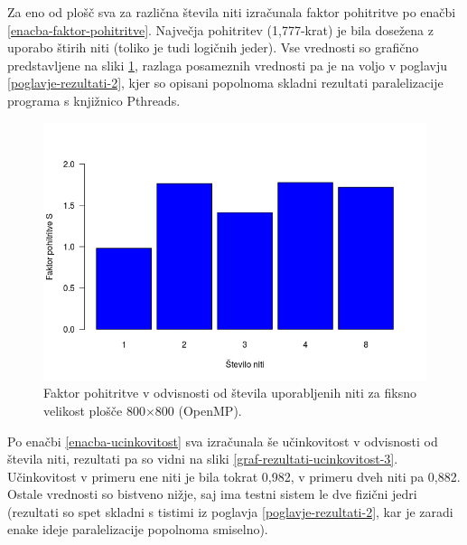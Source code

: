 \documentclass[a4paper,titlepage,11pt]{article}
\begin{document}
Za eno od plošč sva za različna števila niti izračunala faktor pohitritve po enačbi \ref{enacba-faktor-pohitritve}. Največja pohitritev (1,777-krat) je bila dosežena z uporabo štirih niti (toliko je tudi logičnih jeder). Vse vrednosti so grafično predstavljene na sliki \ref{graf-rezultati-pohitritev-3}, razlaga posameznih vrednosti pa je na voljo v poglavju \ref{poglavje-rezultati-2}, kjer so opisani popolnoma skladni rezultati paralelizacije programa s knjižnico Pthreads.

\begin{figure}[H]
\begin{center}
\includegraphics[scale=0.55]{graf-rezultati-3_2.png}
\caption{Faktor pohitritve v odvisnosti od števila uporabljenih niti za fiksno velikost plošče 800$\times$800 (OpenMP).}
\label{graf-rezultati-pohitritev-3}
\end{center}
\vspace{-25pt}
\end{figure}

Po enačbi \ref{enacba-ucinkovitost} sva izračunala še učinkovitost v odvisnosti od števila niti, rezultati pa so vidni na sliki \ref{graf-rezultati-ucinkovitost-3}. Učinkovitost v primeru ene niti je bila tokrat 0,982, v primeru dveh niti pa 0,882. Ostale vrednosti so bistveno nižje, saj ima testni sistem le dve fizični jedri (rezultati so spet skladni s tistimi iz poglavja \ref{poglavje-rezultati-2}, kar je zaradi enake ideje paralelizacije popolnoma smiselno). 
\end{document}
